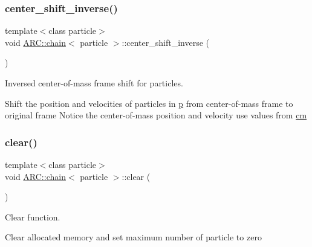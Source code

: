 \subsubsection{\texorpdfstring{center\+\_\+shift\+\_\+inverse()}{center\_shift\_inverse()}}
{\footnotesize\ttfamily template$<$class particle$>$ \\
void \hyperlink{classARC_1_1chain}{A\+R\+C\+::chain}$<$ particle $>$\+::center\+\_\+shift\+\_\+inverse (\begin{DoxyParamCaption}{ }\end{DoxyParamCaption})\hspace{0.3cm}{\ttfamily [inline]}}



Inversed center-\/of-\/mass frame shift for particles. 

Shift the position and velocities of particles in \hyperlink{classARC_1_1chain_af1793b656e139e1f87c2e0a55f87514b}{p} from center-\/of-\/mass frame to original frame Notice the center-\/of-\/mass position and velocity use values from \hyperlink{classARC_1_1chain_ae9f6a5cbf7aac2b33c7274e7e10916ed}{cm} \hypertarget{classARC_1_1chain_a5299fa50788dc7e5d15504c33f76333f}{}\label{classARC_1_1chain_a5299fa50788dc7e5d15504c33f76333f} 
\subsubsection{\texorpdfstring{clear()}{clear()}}
{\footnotesize\ttfamily template$<$class particle$>$ \\
void \hyperlink{classARC_1_1chain}{A\+R\+C\+::chain}$<$ particle $>$\+::clear (\begin{DoxyParamCaption}{ }\end{DoxyParamCaption})\hspace{0.3cm}{\ttfamily [inline]}}



Clear function. 

Clear allocated memory and set maximum number of particle to zero \hypertarget{classARC_1_1chain_ab831215debbd09466cadb1b961dd0a18}{}\label{classARC_1_1chain_ab831215debbd09466cadb1b961dd0a18} 
